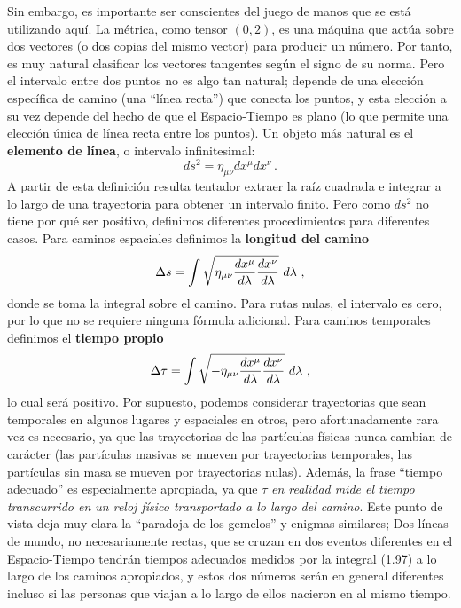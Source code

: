\documentclass[11pt,b5paper,openany,twoside]{book}
\newcommand{\mn}{{\mu\nu}}
\begin{document}
Sin embargo, es importante ser conscientes del juego de manos que se está utilizando aquí.
La métrica, como tensor $(0,2)$, es una máquina que actúa sobre dos vectores (o dos copias del mismo vector) para producir un número.
Por tanto, es muy natural clasificar los vectores tangentes según el signo de su norma.
Pero el intervalo entre dos puntos no es algo tan natural; depende de una elección específica de camino (una ``línea recta'') que conecta los puntos, y esta elección a su vez depende del hecho de que el Espacio-Tiempo es plano (lo que permite una elección única de línea recta entre los puntos).
Un objeto más natural es el {\bf elemento de línea}, o intervalo infinitesimal:
\begin{equation}
ds^2 = \eta_\mn dx^\mu dx^\nu\,.\label{1.95}
\end{equation}
A partir de esta definición resulta tentador extraer la raíz cuadrada e integrar a lo largo de una trayectoria para obtener un intervalo finito.
Pero como $ds^2$ no tiene por qué ser positivo, definimos diferentes procedimientos para diferentes casos.
Para caminos espaciales definimos la {\bf longitud del camino}
\begin{equation}
\Delta s = \int \sqrt{\eta_\mn{{dx^\mu}\over{d\lambda}}
{{dx^\nu}\over{d\lambda}}}\ d\lambda\ ,\label{1.96}
\end{equation}
donde se toma la integral sobre el camino.
Para rutas nulas, el intervalo es cero, por lo que no se requiere ninguna fórmula adicional.
Para caminos temporales definimos el {\bf tiempo propio}
\begin{equation}
\Delta \tau = \int \sqrt{-\eta_\mn{{dx^\mu}\over{d\lambda}}
{{dx^\nu}\over{d\lambda}}}\ d\lambda\ ,\label{1.97}
\end{equation}
lo cual será positivo.
Por supuesto, podemos considerar trayectorias que sean temporales en algunos lugares y espaciales en otros, pero afortunadamente rara vez es necesario, ya que las trayectorias de las partículas físicas nunca cambian de carácter (las partículas masivas se mueven por trayectorias temporales, las partículas sin masa se mueven por trayectorias nulas).
Además, la frase ``tiempo adecuado'' es especialmente apropiada, ya que $\tau$ \textit{en realidad mide el tiempo transcurrido en un reloj físico transportado a lo largo del camino}.
Este punto de vista deja muy clara la ``paradoja de los gemelos'' y enigmas similares; Dos líneas de mundo, no necesariamente rectas, que se cruzan en dos eventos diferentes en el Espacio-Tiempo tendrán tiempos adecuados medidos por la integral (1.97) a lo largo de los caminos apropiados, y estos dos números serán en general diferentes incluso si las personas que viajan a lo largo de ellos nacieron en al mismo tiempo.
\end{document}
